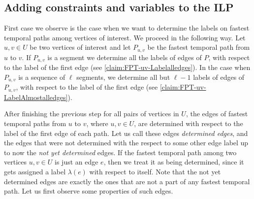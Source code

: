 \documentclass[11pt,a4paper]{article}
\theoremstyle{remark}
\theoremstyle{definition}
\begin{document}
\subsection{Adding constraints and variables to the ILP}
First case we observe is the case when we want to determine the labels on fastest temporal paths among vertices of interest.
We proceed in the following way.
Let $u,v \in U$ be two vertices of interest and let $P_{u,v}$ be the fastest temporal path from $u$ to $v$.
If $P_{u,v}$ is a segment we determine all the labels of edges of $P$, with respect to the label of the first edge (see \cref{claim:FPT-uv-Labelalledges}).
In the case when $P_{u,v}$ is a sequence of $\ell$ segments, we determine all but $\ell - 1$ labels of edges of $P_{u,v}$, with respect to the label of the first edge (see \cref{claim:FPT-uv-LabelAlmostalledges}). 

After finishing the previous step for all pairs of vertices in $U$,
the edges of fastest temporal paths from $u$ to $v$, where $u,v \in U$, are determined with respect to the label of the first edge of each path.
Let us call these edges \emph{determined edges}, and the edges that were not determined with the respect to some other edge label up to now the \emph{not yet determined} edges.
If the fastest temporal path among two vertices $u,v \in U$ is just an edge $e$, then we treat it as being determined, since it gets assigned a label $\lambda(e)$ with respect to itself.
Note that the not yet determined edges are exactly the ones that are not a part of any fastest temporal path.
Let us first observe some properties of such edges.
\end{document}
